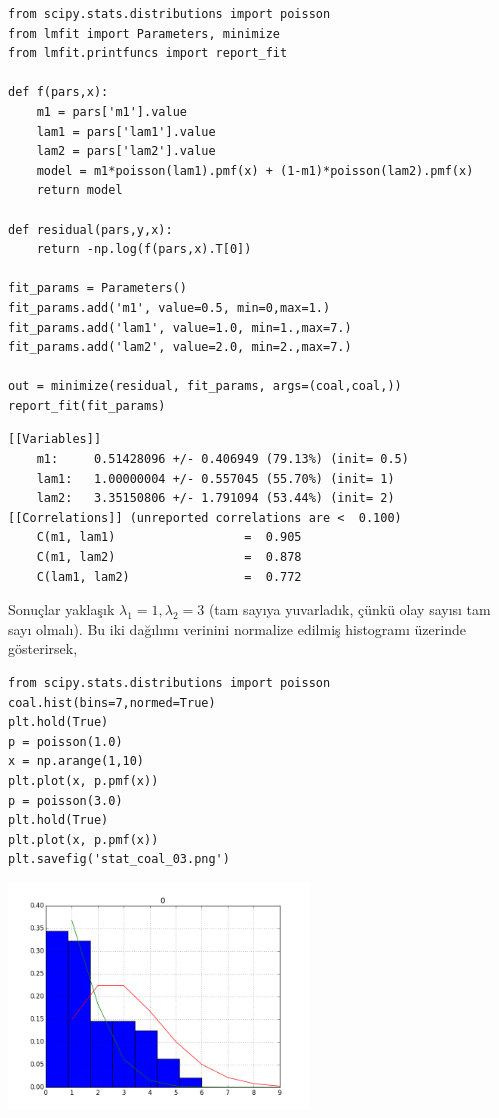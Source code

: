 \documentclass[12pt,fleqn]{article}\usepackage{../../common}
\begin{document}
\begin{verbatim}
from scipy.stats.distributions import poisson
from lmfit import Parameters, minimize
from lmfit.printfuncs import report_fit

def f(pars,x):
    m1 = pars['m1'].value
    lam1 = pars['lam1'].value
    lam2 = pars['lam2'].value
    model = m1*poisson(lam1).pmf(x) + (1-m1)*poisson(lam2).pmf(x) 
    return model
    
def residual(pars,y,x):
    return -np.log(f(pars,x).T[0])

fit_params = Parameters()
fit_params.add('m1', value=0.5, min=0,max=1.)
fit_params.add('lam1', value=1.0, min=1.,max=7.)
fit_params.add('lam2', value=2.0, min=2.,max=7.)

out = minimize(residual, fit_params, args=(coal,coal,))
report_fit(fit_params)
\end{verbatim}

\begin{verbatim}
[[Variables]]
    m1:     0.51428096 +/- 0.406949 (79.13%) (init= 0.5)
    lam1:   1.00000004 +/- 0.557045 (55.70%) (init= 1)
    lam2:   3.35150806 +/- 1.791094 (53.44%) (init= 2)
[[Correlations]] (unreported correlations are <  0.100)
    C(m1, lam1)                  =  0.905 
    C(m1, lam2)                  =  0.878 
    C(lam1, lam2)                =  0.772 
\end{verbatim}

Sonuçlar yaklaşık $\lambda_1=1,\lambda_2=3$ (tam sayıya yuvarladık, çünkü
olay sayısı tam sayı olmalı). Bu iki dağılımı verinini normalize
edilmiş histogramı üzerinde gösterirsek,

\begin{verbatim}
from scipy.stats.distributions import poisson
coal.hist(bins=7,normed=True)
plt.hold(True)
p = poisson(1.0)
x = np.arange(1,10)
plt.plot(x, p.pmf(x))
p = poisson(3.0)
plt.hold(True)
plt.plot(x, p.pmf(x))
plt.savefig('stat_coal_03.png')
\end{verbatim}

\includegraphics[height=6cm]{stat_coal_03.png}
\end{document}
